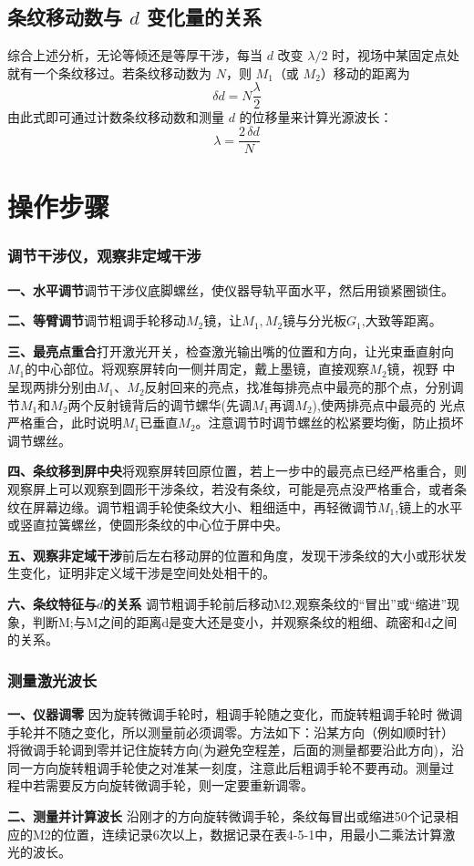 \documentclass[UTF8]{article}
\begin{document}
		\subsection{条纹移动数与 $d$ 变化量的关系}
		综合上述分析，无论等倾还是等厚干涉，每当 $d$ 改变 $\lambda/2$ 时，视场中某固定点处就有一个条纹移过。若条纹移动数为 $N$，则 $M_1$（或 $M_2$）移动的距离为
		\[
		\boxed{\delta d = N\frac{\lambda}{2}}
		\]
		由此式即可通过计数条纹移动数和测量 $d$ 的位移量来计算光源波长：
		\[
		\lambda = \frac{2\,\delta d}{N}
		\]

		\section{操作步骤}
	\subsubsection*{调节干涉仪，观察非定域干涉}
	\par \textbf{一、水平调节}\quad 调节干涉仪底脚螺丝，使仪器导轨平面水平，然后用锁紧圈锁住。
	\par \textbf{二、等臂调节}\quad 调节粗调手轮移动$M_2$镜，让$M_1,M_2$镜与分光板$G_1$,大致等距离。
	\par \textbf{三、最亮点重合}\quad 打开激光开关，检查激光输出嘴的位置和方向，让光束垂直射向$M_1$的中心部位。将观察屏转向一侧并周定，戴上墨镜，直接观察$M_2$镜，视野 中呈现两排分别由$M_1$、$M_2$反射回来的亮点，找准每排亮点中最亮的那个点，分别调 节$M_1$和$M_2$两个反射镜背后的调节螺华(先调$M_1$再调$M_2$),使两排亮点中最亮的 光点严格重合，此时说明$M_1$已垂直$M_2$。注意调节时调节螺丝的松紧要均衡，防止损坏调节螺丝。
	\par \textbf{四、条纹移到屏中央}\quad 将观察屏转回原位置，若上一步中的最亮点已经严格重合，则观察屏上可以观察到圆形干涉条纹，若没有条纹，可能是亮点没严格重合，或者条纹在屏幕边缘。调节粗调手轮使条纹大小、粗细适中，再轻微调节$M_1$,镜上的水平或竖直拉簧螺丝，使圆形条纹的中心位于屏中央。
	\par \textbf{五、观察非定域干涉}\quad 前后左右移动屏的位置和角度，发现干涉条纹的大小或形状发生变化，证明非定义域干涉是空间处处相干的。
	\par \textbf{六、条纹特征与$d$的关系} \quad 调节粗调手轮前后移动M2,观察条纹的“冒出”或“缩进”现象，判断M;与M之间的距离d是变大还是变小，并观察条纹的粗细、疏密和d之间的关系。
	
	\subsubsection*{测量激光波长}
	\par \textbf{一、仪器调零} \quad 因为旋转微调手轮时，粗调手轮随之变化，而旋转粗调手轮时
	微调手轮并不随之变化，所以测量前必须调零。方法如下：沿某方向（例如顺时针）
	将微调手轮调到零并记住旋转方向(为避免空程差，后面的测量都要沿此方向)，沿
	同一方向旋转粗调手轮使之对准某一刻度，注意此后粗调手轮不要再动。测量过
	程中若需要反方向旋转微调手轮，则一定要重新调零。
	\par \textbf{二、测量并计算波长} \quad 沿刚才的方向旋转微调手轮，条纹每冒出或缩进50个记录相应的M2的位置，连续记录6次以上，数据记录在表4-5-1中，用最小二乘法计算激光的波长。
\end{document}
